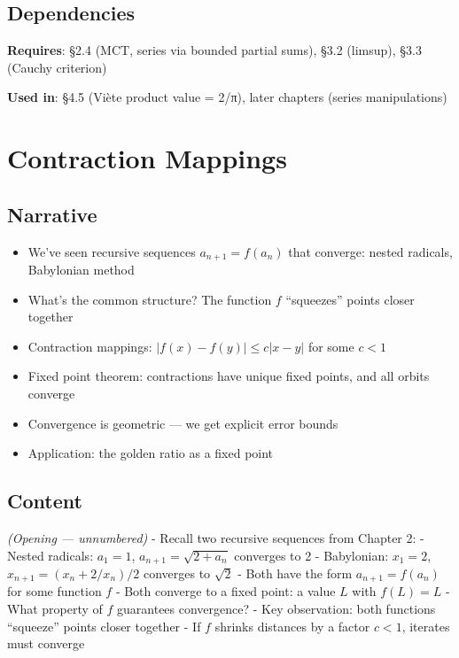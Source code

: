 \documentclass[
  10pt,
  letterpaper,
]{scrbook}
\providecommand{\tightlist}{%
  \setlength{\itemsep}{0pt}\setlength{\parskip}{0pt}}
\begin{document}
\subsection{Dependencies}\label{dependencies-16}

\textbf{Requires}: §2.4 (MCT, series via bounded partial sums), §3.2
(limsup), §3.3 (Cauchy criterion)

\textbf{Used in}: §4.5 (Viète product value = 2/π), later chapters
(series manipulations)

\section{Contraction Mappings}\label{contraction-mappings}

\subsection{Narrative}\label{narrative-17}

\begin{itemize}
\tightlist
\item
  We've seen recursive sequences \(a_{n+1} = f(a_n)\) that converge:
  nested radicals, Babylonian method
\item
  What's the common structure? The function \(f\) ``squeezes'' points
  closer together
\item
  Contraction mappings: \(|f(x) - f(y)| \leq c|x-y|\) for some \(c < 1\)
\item
  Fixed point theorem: contractions have unique fixed points, and all
  orbits converge
\item
  Convergence is geometric --- we get explicit error bounds
\item
  Application: the golden ratio as a fixed point
\end{itemize}

\subsection{Content}\label{content-17}

\emph{(Opening --- unnumbered)} - Recall two recursive sequences from
Chapter 2: - Nested radicals: \(a_1 = 1\), \(a_{n+1} = \sqrt{2 + a_n}\)
converges to 2 - Babylonian: \(x_1 = 2\), \(x_{n+1} = (x_n + 2/x_n)/2\)
converges to \(\sqrt{2}\) - Both have the form \(a_{n+1} = f(a_n)\) for
some function \(f\) - Both converge to a fixed point: a value \(L\) with
\(f(L) = L\) - What property of \(f\) guarantees convergence? - Key
observation: both functions ``squeeze'' points closer together - If
\(f\) shrinks distances by a factor \(c < 1\), iterates must converge
\end{document}
